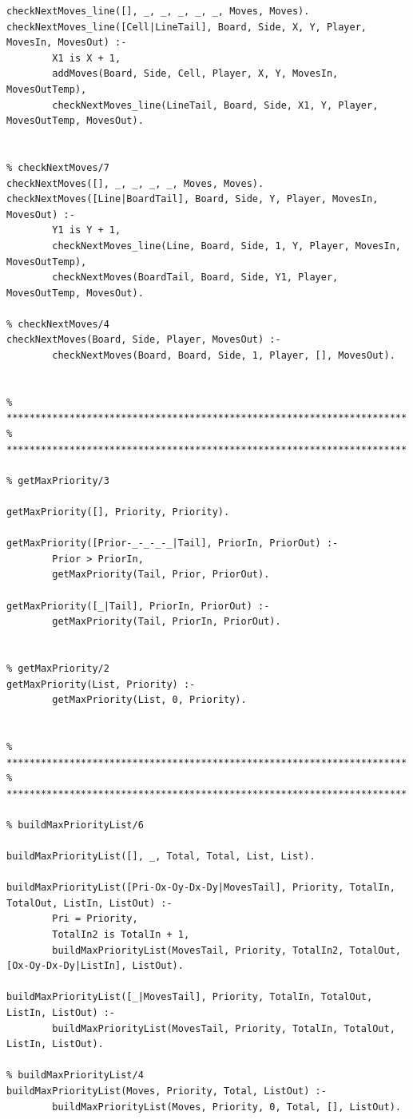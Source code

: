 \documentclass[15pt,a4paper]{article}
\begin{document}
\begin{lstlisting}
checkNextMoves_line([], _, _, _, _, _, Moves, Moves).
checkNextMoves_line([Cell|LineTail], Board, Side, X, Y, Player, MovesIn, MovesOut) :-
		X1 is X + 1,
		addMoves(Board, Side, Cell, Player, X, Y, MovesIn, MovesOutTemp),
		checkNextMoves_line(LineTail, Board, Side, X1, Y, Player, MovesOutTemp, MovesOut).
	

% checkNextMoves/7
checkNextMoves([], _, _, _, _, Moves, Moves).
checkNextMoves([Line|BoardTail], Board, Side, Y, Player, MovesIn, MovesOut) :-
		Y1 is Y + 1,
		checkNextMoves_line(Line, Board, Side, 1, Y, Player, MovesIn, MovesOutTemp),
		checkNextMoves(BoardTail, Board, Side, Y1, Player, MovesOutTemp, MovesOut).

% checkNextMoves/4
checkNextMoves(Board, Side, Player, MovesOut) :-
		checkNextMoves(Board, Board, Side, 1, Player, [], MovesOut).


% **********************************************************************
% **********************************************************************

% getMaxPriority/3

getMaxPriority([], Priority, Priority).

getMaxPriority([Prior-_-_-_-_|Tail], PriorIn, PriorOut) :-
		Prior > PriorIn,
		getMaxPriority(Tail, Prior, PriorOut).

getMaxPriority([_|Tail], PriorIn, PriorOut) :-
		getMaxPriority(Tail, PriorIn, PriorOut).

		
% getMaxPriority/2
getMaxPriority(List, Priority) :-
		getMaxPriority(List, 0, Priority).
		

% **********************************************************************
% **********************************************************************

% buildMaxPriorityList/6

buildMaxPriorityList([], _, Total, Total, List, List).

buildMaxPriorityList([Pri-Ox-Oy-Dx-Dy|MovesTail], Priority, TotalIn, TotalOut, ListIn, ListOut) :-
		Pri = Priority,
		TotalIn2 is TotalIn + 1,
		buildMaxPriorityList(MovesTail, Priority, TotalIn2, TotalOut, [Ox-Oy-Dx-Dy|ListIn], ListOut).

buildMaxPriorityList([_|MovesTail], Priority, TotalIn, TotalOut, ListIn, ListOut) :-
		buildMaxPriorityList(MovesTail, Priority, TotalIn, TotalOut, ListIn, ListOut).

% buildMaxPriorityList/4
buildMaxPriorityList(Moves, Priority, Total, ListOut) :-
		buildMaxPriorityList(Moves, Priority, 0, Total, [], ListOut).



\end{lstlisting}
\end{document}
